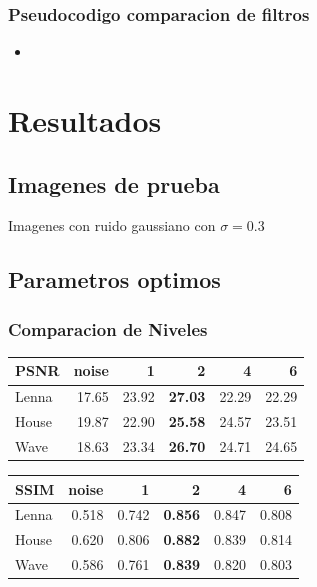 \documentclass{beamer}
\begin{document}
  \begin{frame}
    \frametitle{Pseudocodigo comparacion de filtros}
    \begin{itemize}
      \item 
    \end{itemize}
    
  
  \end{frame}

  \section{Resultados}

  \subsection{Imagenes de prueba}

  \begin{frame}
  
    Imagenes con ruido gaussiano con $\sigma=0.3$
  \end{frame}

  \subsection{Parametros optimos}

  \begin{frame}
    \frametitle{ Comparacion de Niveles }
    \centering
    \begin{tabular}{lrrrrr}
      \toprule
      {PSNR} &  noise &      1 &      2 &      4 &      6 \\
      \midrule
      Lenna &  17.65 &  23.92 &  \bf{27.03} &  22.29 &  22.29 \\
      House &  19.87 &  22.90 &  \bf{25.58} &  24.57 &  23.51 \\
      Wave &  18.63 &  23.34 &  \bf{26.70} &  24.71 &  24.65 \\
      \bottomrule
      \end{tabular}
  
      \begin{tabular}{lrrrrr}
        {SSIM} &  noise &      1 &      2 &      4 &      6 \\
        \midrule
        Lenna &  0.518 &  0.742 &  \bf{0.856} &  0.847 &  0.808 \\
        House &  0.620 &  0.806 &  \bf{0.882} &  0.839 &  0.814 \\
        Wave &  0.586 &  0.761 &  \bf{0.839} &  0.820 &  0.803 \\
        \bottomrule
        \end{tabular}

  \end{frame}
\end{document}
